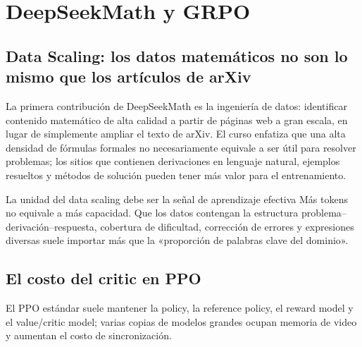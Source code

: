 \section{DeepSeekMath y GRPO}

\subsection{Data Scaling: los datos matemáticos no son lo mismo que los artículos de arXiv}

La primera contribución de DeepSeekMath es la ingeniería de datos: identificar contenido matemático de alta calidad a partir de páginas web a gran escala, en lugar de simplemente ampliar el texto de arXiv. El curso enfatiza que una alta densidad de fórmulas formales no necesariamente equivale a ser útil para resolver problemas; los sitios que contienen derivaciones en lenguaje natural, ejemplos resueltos y métodos de solución pueden tener más valor para el entrenamiento.




\begin{importantbox}{La unidad del data scaling debe ser la señal de aprendizaje efectiva}
Más tokens no equivale a más capacidad. Que los datos contengan la estructura problema--derivación--respuesta, cobertura de dificultad, corrección de errores y expresiones diversas suele importar más que la «proporción de palabras clave del dominio».
\end{importantbox}

\subsection{El costo del critic en PPO}

El PPO estándar suele mantener la policy, la reference policy, el reward model y el value/critic model; varias copias de modelos grandes ocupan memoria de video y aumentan el costo de sincronización.

